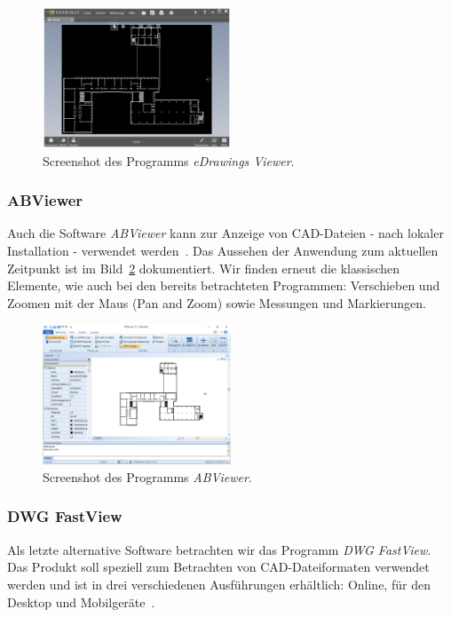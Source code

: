 \begin{figure}
    \includegraphics[width=0.5\textwidth]{res/edrawings-viewer.png}
    \caption{Screenshot des Programms \textit{eDrawings Viewer}.}
    \label{fig:edrawings-viewer}
\end{figure}

\subsubsection{ABViewer}
\label{subsubsec:abviewer}

Auch die Software \textit{ABViewer} kann zur Anzeige von CAD-Dateien - nach lokaler Installation - verwendet werden~\cite{ABViewer}.
Das Aussehen der Anwendung zum aktuellen Zeitpunkt ist im Bild~\ref{fig:abviewer} dokumentiert.
Wir finden erneut die klassischen Elemente, wie auch bei den bereits betrachteten Programmen: Verschieben und Zoomen mit der Maus (Pan and Zoom) sowie Messungen und Markierungen.

\begin{figure}
    \includegraphics[width=0.5\textwidth]{res/abviewer.png}
    \caption{Screenshot des Programms \textit{ABViewer}.}
    \label{fig:abviewer}
\end{figure}

\subsubsection{DWG FastView}
\label{subsubsec:dwg-fastview}

Als letzte alternative Software betrachten wir das Programm \textit{DWG FastView}.
Das Produkt soll speziell zum Betrachten von CAD-Dateiformaten verwendet werden und ist in drei verschiedenen Ausführungen erhältlich: Online, für den Desktop und Mobilgeräte~\cite{DWGFastView}.

